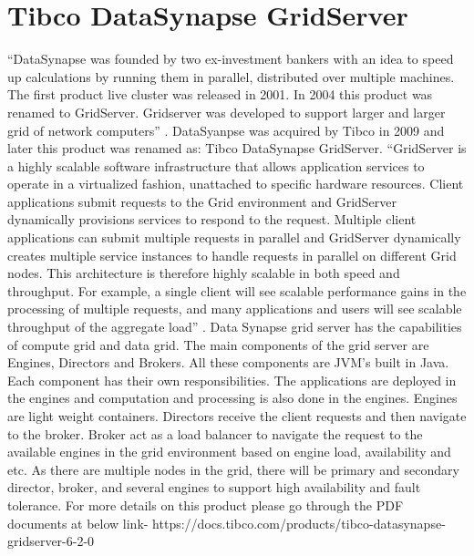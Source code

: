 \section{Tibco DataSynapse GridServer}

“DataSynapse was founded by two ex-investment bankers with an idea to speed up calculations by running them in parallel, distributed over multiple machines. The first product live cluster was released in 2001. In 2004 this product was renamed to GridServer. Gridserver was developed to support larger and larger grid of network computers” \cite{hid-sp18-514-datasynapsewiki}.
DataSyanpse was acquired by Tibco in 2009 and later this product was renamed as: Tibco DataSynapse GridServer\cite{hid-sp18-514-tibcodatasynapsewiki}.
“GridServer is a highly scalable software infrastructure that allows application services to operate in a virtualized fashion, unattached to specific hardware resources. Client applications submit requests to the Grid environment and GridServer dynamically provisions services to respond to the request. Multiple client applications can submit multiple requests in parallel and GridServer dynamically creates multiple service instances to handle requests in parallel on different Grid nodes. This architecture is therefore highly scalable in both speed and throughput. For example, a single client will see scalable performance gains in the processing of multiple requests, and many applications and users will see scalable throughput of the aggregate load” \cite{hid-sp18-514-tibcods}.
Data Synapse grid server has the capabilities of compute grid and data grid. The main components of the grid server are Engines, Directors and Brokers. All these components are JVM’s built in Java.  Each component has their own responsibilities. The applications are deployed in the engines and computation and processing is also done in the engines. Engines are light weight containers. Directors receive the client requests and then navigate to the broker. Broker act as a load balancer to navigate the request to the available engines in the grid environment based on engine load, availability and etc. As there are multiple nodes in the grid, there will be primary and secondary director, broker, and several engines to support high availability and fault tolerance\cite{hid-sp18-514-tibcods}.
For more details on this product please go through the PDF documents at below link-
https://docs.tibco.com/products/tibco-datasynapse-gridserver-6-2-0



